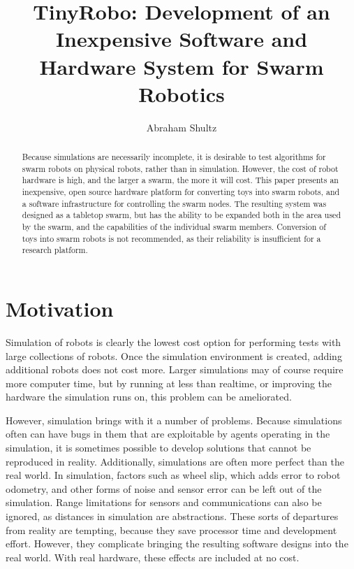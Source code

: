 \documentclass[]{article}
\title{TinyRobo: Development of an Inexpensive Software and Hardware System for Swarm Robotics}
\author{Abraham Shultz}
\begin{document}
\maketitle

\begin{abstract}
Because simulations are necessarily incomplete, it is desirable to test algorithms for swarm robots on physical robots, rather than in simulation. 
However, the cost of robot hardware is high, and the larger a swarm, the more it will cost. 
This paper presents an inexpensive, open source hardware platform for converting toys into swarm robots, and a software infrastructure for controlling the swarm nodes. 
The resulting system was designed as a tabletop swarm, but has the ability to be expanded both in the area used by the swarm, and the capabilities of the individual swarm members. 
Conversion of toys into swarm robots is not recommended, as their reliability is insufficient for a research platform.

\end{abstract}

\section{Motivation}

Simulation of robots is clearly the lowest cost option for performing tests with large collections of robots. 
Once the simulation environment is created, adding additional robots does not cost more. 
Larger simulations may of course require more computer time, but by running at less than realtime, or improving the hardware the simulation runs on, this problem can be ameliorated. 

However, simulation brings with it a number of problems. 
Because simulations often can have bugs in them that are exploitable by agents operating in the simulation, it is sometimes possible to develop solutions that cannot be reproduced in reality. 
Additionally, simulations are often more perfect than the real world. 
In simulation, factors such as wheel slip, which adds error to robot odometry, and other forms of noise and sensor error can be left out of the simulation. 
Range limitations for sensors and communications can also be ignored, as distances in simulation are abstractions. 
These sorts of departures from reality are tempting, because they save processor time and development effort.
However, they complicate bringing the resulting software designs into the real world.  
With real hardware, these effects are included at no cost. 
\end{document}

